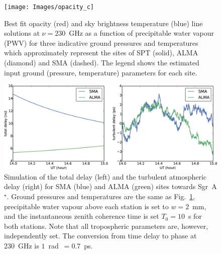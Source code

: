 \begin{figure}
\begin{center}
\texttt{[image: Images/opacity\_c]}
\caption{Best fit opacity (red) and sky brightness temperature (blue) line solutions at $\nu =230$~GHz as a function of precipitable water vapour (PWV) for three indicative ground pressures and temperatures which approximately represent the sites of SPT (solid), ALMA (diamond) and SMA (dashed). The legend shows the estimated input ground (pressure, temperature) parameters for each site.\label{fig:mean_atm}%
}
\end{center}
\end{figure}


\begin{figure}
\begin{center}
\includegraphics[width=\columnwidth]{Images/delays}
\caption{Simulation of the total delay (left) and the turbulent atmospheric delay (right) for SMA (blue) and ALMA (green) sites towards Sgr~A$^\star$. Ground pressures and temperatures are the same as Fig.~\ref{fig:mean_atm}, precipitable water vapour above each station is set to $w=2$~mm, and the instantaneous zenith coherence time is set $T_0=10$~s for both stations. Note that all tropospheric parameters are, however, independently set. The conversion from time delay to phase at 230~GHz is $1$~rad~$=0.7$~ps.\label{delay_plots}%
}
\end{center}
\end{figure}


